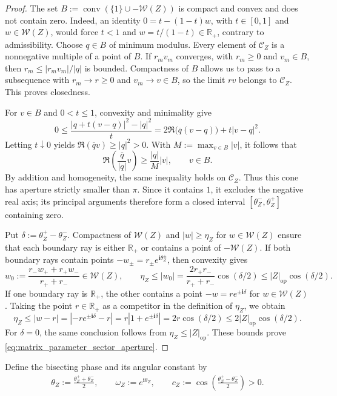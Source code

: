 \documentclass[EJP, preprint, NODS, nobera, nofontexpansion]{ejpecp}
\newcommand{\ii}{\mathbf{i}}
\DeclareMathOperator{\op}{op}
\begin{document}
\begin{proof}
The set \(B:=\operatorname{conv}(\{1\}\cup-\mathcal W(Z))\) is compact
and convex and does not contain zero. Indeed, an identity
\(0=t-(1-t)w\), with \(t\in[0,1]\) and \(w\in\mathcal W(Z)\), would
force \(t<1\) and \(w=t/(1-t)\in\mathbb R_+\), contrary to
admissibility. Choose \(q\in B\) of minimum modulus.
Every element of \(\mathcal C_Z\) is a nonnegative multiple of a point
of \(B\). If \(r_mv_m\) converges, with \(r_m\geq0\) and \(v_m\in B\),
then \(r_m\leq|r_mv_m|/|q|\) is bounded. Compactness of \(B\) allows
us to pass to a subsequence with \(r_m\to r\geq0\) and \(v_m\to v\in B\),
so the limit \(rv\) belongs to \(\mathcal C_Z\). This proves closedness.

For \(v\in B\) and \(0<t\leq1\), convexity and minimality give
\[
    0\leq\frac{|q+t(v-q)|^2-|q|^2}{t}
    =2\Re\bigl(\overline q(v-q)\bigr)+t|v-q|^2.
\]
Letting \(t\downarrow0\) yields
\(\Re(\overline qv)\geq|q|^2>0\). With
\(M:=\max_{v\in B}|v|\), it follows that
\[
    \Re\left(\frac{\overline q}{|q|}v\right)
    \geq\frac{|q|}{M}|v|,\qquad v\in B.
\]
By addition and homogeneity, the same inequality holds on
\(\mathcal C_Z\). Thus this cone has aperture strictly smaller than
\(\pi\). Since it contains \(1\), it excludes the negative real axis;
its principal arguments therefore form a closed interval
\([\theta_Z^-,\theta_Z^+]\) containing zero.

Put \(\delta:=\theta_Z^+-\theta_Z^-\). Compactness of \(\mathcal W(Z)\)
and \(|w|\geq\eta_Z\) for \(w\in\mathcal W(Z)\) ensure that each
boundary ray is either \(\mathbb R_+\) or contains a point of
\(-\mathcal W(Z)\). If both boundary rays contain points
\(-w_\pm=r_\pm e^{\ii\theta_Z^\pm}\), then convexity gives
\[
    w_0:=\frac{r_-w_++r_+w_-}{r_++r_-}\in\mathcal W(Z),
    \qquad
    \eta_Z\leq|w_0|
    =\frac{2r_+r_-}{r_++r_-}\cos(\delta/2)
    \leq|Z|_{\op}\cos(\delta/2).
\]
If one boundary ray is $\mathbb R_+$, the other contains a point $-w=re^{\pm\ii\delta}$ for $w\in\mathcal W(Z)$.
Taking the point $r\in\mathbb R_+$ as a competitor in the definition of
$\eta_Z$, we obtain
\[
    \eta_Z
    \leq |w-r|
    =
    \left|-re^{\pm\ii\delta}-r\right|
    =
    r\left|1+e^{\pm\ii\delta}\right|
    =
    2r\cos(\delta/2)
    \leq
    2|Z|_{\op}\cos(\delta/2).
\]
For \(\delta=0\), the same conclusion follows from
\(\eta_Z\leq|Z|_{\op}\). These bounds prove
\eqref{eq:matrix_parameter_sector_aperture}.
\end{proof}

Define the bisecting phase and its angular constant by
\begin{align}\label{eq:matrix_parameter_angular_phase}
    \theta_Z:=\frac{\theta_Z^++\theta_Z^-}{2},
    \qquad
    \omega_Z:=e^{\ii\theta_Z},
    \qquad
    c_Z:=\cos\left(\frac{\theta_Z^+-\theta_Z^-}{2}\right)>0.
\end{align}
\end{document}
